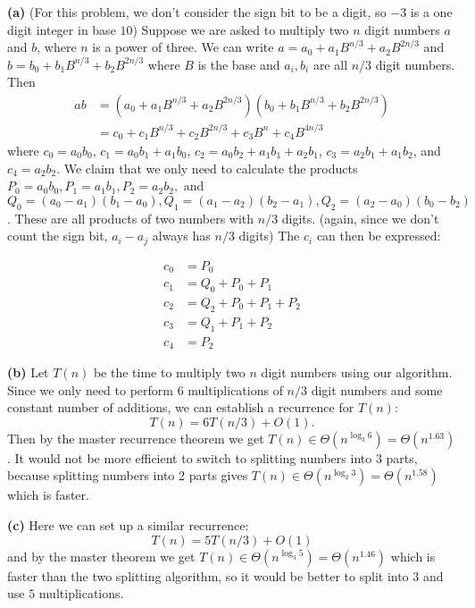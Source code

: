 \documentclass[11pt,letterpaper]{article}
\begin{document}
\begin{solution}
    \textbf{(a)} (For this problem, we don't consider the sign bit to be a digit, so $-3$ is a one digit integer in base $10$) Suppose we are asked to multiply two $n$ digit numbers $a$ and $b$, where $n$ is a power of three. We can write $a=a_0+a_1B^{n /3}+a_2B^{2n /3}$ and $b= b_0+b_1B^{n /3}+b_2B^{2n /3}$ where $B$ is the base and $a_i, b_i$ are all $n /3$ digit numbers. Then
    \[
        \begin{aligned}
            ab &= (a_0 + a_1B^{n /3}+ a_2 B^{2n /3})(b_0+ b_1B^{n /3}+b_2B^{2n /3})\\
            &= c_0 + c_1B^{n /3}+c_2B^{2n /3}+c_3B^n+c_4B^{4n/3} 
        \end{aligned}
    \] 
    where $c_0=a_0 b_0$, $c_1=a_0 b_1 + a_1 b_0$, $c_2=a_0 b_2+a_1 b_1 + a_2 b_1$, $c_3 = a_2 b_1+a_1 b_2$, and $c_4=a_2 b_2$. We claim that we only need to calculate the products $P_0 = a_0 b_0, P_1 = a_1 b_1, P_2 = a_2 b_2,$ and $Q_0 = (a_0-a_1)(b_1-a_0), Q_1 = (a_1-a_2)(b_2-a_1), Q_2 = (a_2-a_0)(b_0-b_2)$. These are all products of two numbers with $n/3$ digits. (again, since we don't count the sign bit, $a_i-a_j$ always has $n/3$ digits) The $c_i$ can then be expressed:

    \[
        \begin{aligned}
            c_0 &= P_0\\
            c_1 &= Q_0 + P_0 + P_1\\
            c_2 &= Q_2 + P_0 + P_1 + P_2\\
            c_3 &= Q_1 + P_1 + P_2\\
            c_4 &= P_2
        \end{aligned}
    \] 

    \textbf{(b)} Let $T(n)$ be the time to multiply two $n$ digit numbers using our algorithm. Since we only need to perform $6$ multiplications of $n /3$ digit numbers and some constant number of additions, we can establish a recurrence for $T(n)$:
    \[
        T(n)=6T(n /3) + O(1)
    .\] 
    Then by the master recurrence theorem we get $T(n)\in \Theta(n^{\log_3 6})=\Theta(n^{1.63})$. It would not be more efficient to switch to splitting numbers into $3$ parts, because splitting numbers into 2 parts gives $T(n)\in \Theta(n^{\log_2 3})=\Theta(n^{1.58})$ which is faster.

    \textbf{(c)} Here we can set up a similar recurrence:
    \[
        T(n)=5T(n /3) + O(1)
    \]
    and by the master theorem we get $T(n)\in \Theta(n^{\log_3 5})=\Theta(n^{1.46})$ which is faster than the two splitting algorithm, so it would be better to split into $3$ and use $5$ multiplications.
\end{solution}
\end{document}
